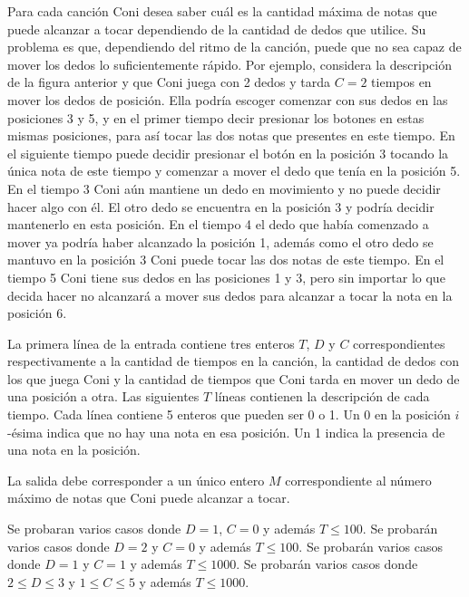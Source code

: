 \documentclass{oci}
\begin{document}
\begin{problemDescription}
  Para cada canción Coni desea saber cuál es la cantidad máxima de notas que
  puede alcanzar a tocar dependiendo de la cantidad de dedos que utilice.
  Su problema es que, dependiendo del ritmo de la canción, puede que no sea
  capaz de mover los dedos lo suficientemente rápido.
  Por ejemplo, considera la descripción de la figura anterior y que Coni juega
  con 2 dedos y tarda $C=2$ tiempos en mover los dedos de posición.
  Ella podría escoger comenzar con sus dedos en las posiciones 3 y 5, y en el
  primer tiempo decir presionar los botones en estas mismas posiciones, para así
  tocar las dos notas que presentes en este tiempo.
  En el siguiente tiempo puede decidir presionar el botón en la posición 3
  tocando la única nota de este tiempo y comenzar a mover el dedo que
  tenía en la posición 5.
  En el tiempo 3 Coni aún mantiene un dedo en movimiento y no puede decidir
  hacer algo con él.
  El otro dedo se encuentra en la posición 3 y podría decidir mantenerlo en esta
  posición.
  En el tiempo 4 el dedo que había comenzado a mover ya podría haber alcanzado
  la posición 1, además como el otro dedo se mantuvo en la posición 3 Coni puede
  tocar las dos notas de este tiempo.
  En el tiempo 5 Coni tiene sus dedos en las posiciones 1 y 3, pero sin importar
  lo que decida hacer no alcanzará a mover sus dedos para alcanzar a tocar la
  nota en la posición 6.
\end{problemDescription}
\begin{inputDescription}
  La primera línea de la entrada contiene tres enteros $T$, $D$ y $C$
  correspondientes respectivamente a la cantidad de tiempos en la canción, la
  cantidad de dedos con los que juega Coni y la cantidad de tiempos que Coni
  tarda en mover un dedo de una posición a otra.
  Las siguientes $T$ líneas contienen la descripción de cada tiempo.
  Cada línea contiene 5 enteros que pueden ser 0 o 1.
  Un 0 en la posición $i$-ésima indica que no hay una nota en esa posición.
  Un 1 indica la presencia de una nota en la posición.
\end{inputDescription}

\begin{outputDescription}
  La salida debe corresponder a un único entero $M$ correspondiente al número
  máximo de notas que Coni puede alcanzar a tocar.
\end{outputDescription}

\begin{scoreDescription}
   Se probaran varios casos donde $D = 1$, $C = 0$ y además $T \le 100$.
   Se probarán varios casos donde $D = 2$ y $C = 0$ y además $T \le 100$.
   Se probarán varios casos donde $D = 1$ y $C = 1$ y además $T \le 1000$.
   Se probarán varios casos donde $2 \le D \le 3$ y $1 \le C \le 5$ y
  además $T \le 1000$.
\end{scoreDescription}

\begin{sampleDescription}
\end{sampleDescription}
\end{document}
